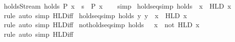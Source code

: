 \begin{isabellebody}
\endisatagproof
{\isafoldproof}%
%
\isadelimproof
\isanewline
%
\endisadelimproof
\isanewline
{}\isamarkupfalse%
\ holds{\isacharunderscore}Stream{\isacharcolon}\ {\isachardoublequoteopen}holds\ P\ {\isacharparenleft}x\ {\isacharhash}{\isacharhash}\ s{\isacharparenright}\ {\isasymlongleftrightarrow}\ P\ x{\isachardoublequoteclose}\isanewline
%
\isadelimproof
\ \ %
\endisadelimproof
%
\isatagproof
{}\isamarkupfalse%
\ simp%
\endisatagproof
{\isafoldproof}%
%
\isadelimproof
\isanewline
%
\endisadelimproof
\isanewline
{}\isamarkupfalse%
\ holds{\isacharunderscore}eq{}{\isacharbrackleft}simp{\isacharbrackright}{\isacharcolon}\ {\isachardoublequoteopen}holds\ {\isacharparenleft}{\isacharparenleft}{\isacharequal}{\isacharparenright}\ x{\isacharparenright}\ {\isacharequal}\ HLD\ {\isacharbraceleft}x{\isacharbraceright}{\isachardoublequoteclose}\isanewline
%
\isadelimproof
\ \ %
\endisadelimproof
%
\isatagproof
{}\isamarkupfalse%
\ rule\ {\isacharparenleft}auto\ simp{\isacharcolon}\ HLD{\isacharunderscore}iff{\isacharparenright}%
\endisatagproof
{\isafoldproof}%
%
\isadelimproof
\isanewline
%
\endisadelimproof
\isanewline
{}\isamarkupfalse%
\ holds{\isacharunderscore}eq{}{\isacharbrackleft}simp{\isacharbrackright}{\isacharcolon}\ {\isachardoublequoteopen}holds\ {\isacharparenleft}{\isasymlambda}y{\isachardot}\ y\ {\isacharequal}\ x{\isacharparenright}\ {\isacharequal}\ HLD\ {\isacharbraceleft}x{\isacharbraceright}{\isachardoublequoteclose}\isanewline
%
\isadelimproof
\ \ %
\endisadelimproof
%
\isatagproof
{}\isamarkupfalse%
\ rule\ {\isacharparenleft}auto\ simp{\isacharcolon}\ HLD{\isacharunderscore}iff{\isacharparenright}%
\endisatagproof
{\isafoldproof}%
%
\isadelimproof
\isanewline
%
\endisadelimproof
\isanewline
{}\isamarkupfalse%
\ not{\isacharunderscore}holds{\isacharunderscore}eq{\isacharbrackleft}simp{\isacharbrackright}{\isacharcolon}\ {\isachardoublequoteopen}holds\ {\isacharparenleft}{\isacharminus}\ {\isacharparenleft}{\isacharequal}{\isacharparenright}\ x{\isacharparenright}\ {\isacharequal}\ not\ {\isacharparenleft}HLD\ {\isacharbraceleft}x{\isacharbraceright}{\isacharparenright}{\isachardoublequoteclose}\isanewline
%
\isadelimproof
\ \ %
\endisadelimproof
%
\isatagproof
{}\isamarkupfalse%
\ rule\ {\isacharparenleft}auto\ simp{\isacharcolon}\ HLD{\isacharunderscore}iff{\isacharparenright}%
\endisatagproof
{\isafoldproof}%
%
\isadelimproof
%
\endisadelimproof
%
\begin{isamarkuptext}%

\end{isamarkuptext}
\end{isabellebody}
